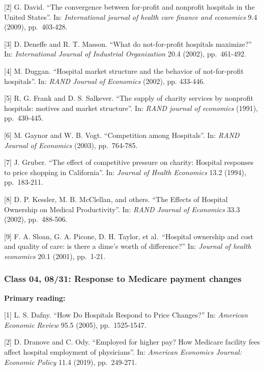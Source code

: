 \documentclass[11pt,]{article}
\begin{document}
{[}2{]} G. David. ``The convergence between for-profit and nonprofit
hospitals in the United States''. In: \emph{International journal of
health care finance and economics} 9.4 (2009), pp.~403-428.

{[}3{]} D. Deneffe and R. T. Masson. ``What do not-for-profit hospitals
maximize?'' In: \emph{International Journal of Industrial Organization}
20.4 (2002), pp.~461-492.

{[}4{]} M. Duggan. ``Hospital market structure and the behavior of
not-for-profit hospitals''. In: \emph{RAND Journal of Economics} (2002),
pp. 433-446.

{[}5{]} R. G. Frank and D. S. Salkever. ``The supply of charity services
by nonprofit hospitals: motives and market structure''. In: \emph{RAND
journal of economics} (1991), pp.~430-445.

{[}6{]} M. Gaynor and W. B. Vogt. ``Competition among Hospitals''. In:
\emph{RAND Journal of Economics} (2003), pp.~764-785.

{[}7{]} J. Gruber. ``The effect of competitive pressure on charity:
Hospital responses to price shopping in California''. In: \emph{Journal
of Health Economics} 13.2 (1994), pp.~183-211.

{[}8{]} D. P. Kessler, M. B. McClellan, and others. ``The Effects of
Hospital Ownership on Medical Productivity''. In: \emph{RAND Journal of
Economics} 33.3 (2002), pp.~488-506.

{[}9{]} F. A. Sloan, G. A. Picone, D. H. Taylor, et al.~``Hospital
ownership and cost and quality of care: is there a dime's worth of
difference?'' In: \emph{Journal of health economics} 20.1 (2001),
pp.~1-21.

\hypertarget{class-04-0831-response-to-medicare-payment-changes}{%
\subsubsection{Class 04, 08/31: Response to Medicare payment
changes}\label{class-04-0831-response-to-medicare-payment-changes}}

\textbf{Primary reading:}

{[}1{]} L. S. Dafny. ``How Do Hospitals Respond to Price Changes?'' In:
\emph{American Economic Review} 95.5 (2005), pp.~1525-1547.

{[}2{]} D. Dranove and C. Ody. ``Employed for higher pay? How Medicare
facility fees affect hospital employment of physicians''. In:
\emph{American Economics Journal: Economic Policy} 11.4 (2019),
pp.~249-271.
\end{document}
